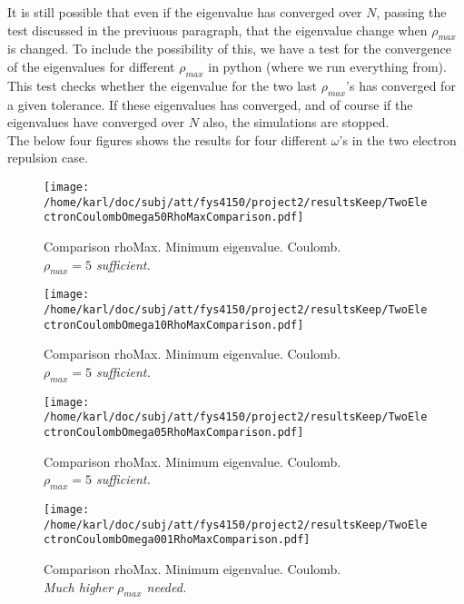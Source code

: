 \documentclass{article}
\begin{document}
It is still possible that even if the eigenvalue has converged over $N$, passing the test discussed in the previuous paragraph, that the eigenvalue change when $\rho_{max}$ is changed. To include the possibility of this, we have a test for the convergence of the eigenvalues for different $\rho_{max}$ in python (where we run everything from). This test checks whether the eigenvalue for the two last $\rho_{max}$'s has converged for a given tolerance. If these eigenvalues has converged, and of course if the eigenvalues have converged over $N$ also, the simulations are stopped.\\

The below four figures shows the results for four different $\omega$'s in the two electron repulsion case.

\begin{minipage}{.49\textwidth} %
	\begin{figure}[H]
		\centering
		\texttt{[image: /home/karl/doc/subj/att/fys4150/project2/resultsKeep/TwoElectronCoulombOmega50RhoMaxComparison.pdf]}
		\caption{Comparison rhoMax. Minimum eigenvalue. Coulomb. \\
			\textit{$\rho_{max} = 5$ sufficient.}}
		\label{1}
	\end{figure}
\end{minipage}\hfill
\begin{minipage}{.49\textwidth}
	\begin{figure}[H]
		\centering
		\texttt{[image: /home/karl/doc/subj/att/fys4150/project2/resultsKeep/TwoElectronCoulombOmega10RhoMaxComparison.pdf]}
		\caption{Comparison rhoMax. Minimum eigenvalue. Coulomb. \\
			\textit{$\rho_{max} = 5$ sufficient.}}
		\label{1}
	\end{figure}
\end{minipage}\hfill
\begin{minipage}{.49\textwidth}
	\begin{figure}[H]
		\centering
		\texttt{[image: /home/karl/doc/subj/att/fys4150/project2/resultsKeep/TwoElectronCoulombOmega05RhoMaxComparison.pdf]}
		\caption{Comparison rhoMax. Minimum eigenvalue. Coulomb. \\
		\textit{$\rho_{max} = 5$ sufficient.}}
		\label{1}
	\end{figure}
\end{minipage}\hfill
\vspace{2ex}
\begin{minipage}{.49\textwidth}
	\begin{figure}[H]
		\centering
		\texttt{[image: /home/karl/doc/subj/att/fys4150/project2/resultsKeep/TwoElectronCoulombOmega001RhoMaxComparison.pdf]}
		\caption{Comparison rhoMax. Minimum eigenvalue. Coulomb. \\
			\textit{Much higher $\rho_{max}$ needed.}}
		\label{1}
	\end{figure}
\end{minipage}\hfill
\vspace{2ex}
\end{document}
